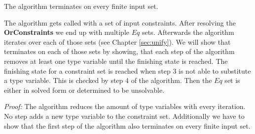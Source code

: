 \begin{theorem}[Termination]\label{theo:unifyTermination}
  The \unify{} algorithm terminates on every finite input set.
\end{theorem}
The \unify{} algorithm gets called with a set of input constraints.
After resolving the \textbf{OrConstraints} we end up with multiple $Eq$ sets.
Afterwards the algorithm iterates over each of those sets (see Chapter \ref{sec:unify}).
We will show that \unify{} terminates on each of those sets by showing,
that each step of the algorithm removes at least one type variable
until the finishing state is reached.
The finishing state for a constraint set is reached when step 3 is not able to substitute a type variable.
This is checked by step 4 of the algorithm.
Then the $Eq$ set is either in solved form or determined to be unsolvable.

\textit{Proof:}
The \unify{} algorithm reduces the amount of type variables with every iteration.
No step adds a new type variable to the constraint set.
Additionally we have to show that the first step of the algorithm also terminates on every finite input set.

